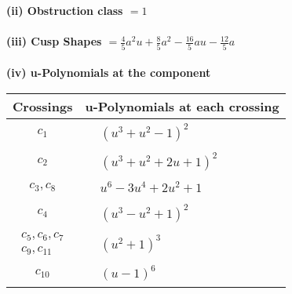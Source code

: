 \documentclass[1p]{elsarticle_modified}
\theoremstyle{definition}
\begin{document}
\flushleft \textbf{(ii) Obstruction class $= 1$}\\~\\
\flushleft \textbf{(iii) Cusp Shapes $= \frac{4}{5} a^2 u+\frac{8}{5} a^2-\frac{16}{5} a u-\frac{12}{5} a$}\\~\\
\newpage\renewcommand{\arraystretch}{1}
\flushleft \textbf{(iv) u-Polynomials at the component}\newline \\
\begin{tabular}{m{50pt}|m{274pt}}
Crossings & \hspace{64pt}u-Polynomials at each crossing \\
\hline $$\begin{aligned}c_{1}\end{aligned}$$&$\begin{aligned}
&(u^3+u^2-1)^2
\end{aligned}$\\
\hline $$\begin{aligned}c_{2}\end{aligned}$$&$\begin{aligned}
&(u^3+u^2+2 u+1)^2
\end{aligned}$\\
\hline $$\begin{aligned}c_{3},c_{8}\end{aligned}$$&$\begin{aligned}
&u^6-3 u^4+2 u^2+1
\end{aligned}$\\
\hline $$\begin{aligned}c_{4}\end{aligned}$$&$\begin{aligned}
&(u^3- u^2+1)^2
\end{aligned}$\\
\hline $$\begin{aligned}c_{5},c_{6},c_{7}\\c_{9},c_{11}\end{aligned}$$&$\begin{aligned}
&(u^2+1)^3
\end{aligned}$\\
\hline $$\begin{aligned}c_{10}\end{aligned}$$&$\begin{aligned}
&(u-1)^6
\end{aligned}$\\
\hline
\end{tabular}\\~\\
\end{document}
